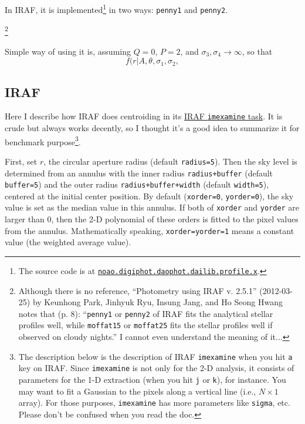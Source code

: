 In IRAF, it is implemented\footnote{The source code is at \href {https://github.com/iraf-community/iraf/blob/master/noao/digiphot/daophot/daolib/profile.x} {\texttt{noao.digiphot.daophot.dailib.profile.x}}.} in two ways: \texttt{penny1} and \texttt{penny2}. 



\footnote{Although there is no reference, ``Photometry using IRAF v. 2.5.1'' (2012-03-25) by Keunhong Park, Jinhyuk Ryu, Insung Jang, and Ho Seong Hwang notes that (p. 8): ``\texttt{penny1} or \texttt{penny2} of IRAF fits the analytical stellar profiles well, while \texttt{moffat15} or \texttt{moffat25} fits the stellar profiles well if observed on cloudy nights.'' I cannot even understand the meaning of it...}

Simple way of using it is, assuming $ Q = 0 $, $ P = 2 $, and $ \sigma_3, \sigma_4 \rightarrow \infty $, so that
\begin{equation}\label{eq: profile penny12}
  f(r|A, \theta, \sigma_1, \sigma_2, 
\end{equation}




\subsection{IRAF}
Here I describe how IRAF does centroiding in its \href{https://iraf.net/irafhelp.php?val=imexam&help=Help+Page}{IRAF \texttt{imexamine} task}. It is crude but always works decently, so I thought it's a good idea to summarize it for benchmark purpose\footnote{The description below is the description of IRAF \texttt{imexamine} when you hit \texttt{a} key on IRAF. Since \texttt{imexamine} is not only for the 2-D analysis, it consists of parameters for the 1-D extraction (when you hit \texttt{j} or \texttt{k}), for instance. You may want to fit a Gaussian to the pixels along a vertical line (i.e., $ N \times 1 $ array). For those purposes, \texttt{imexamine} has more parameters like \texttt{sigma}, etc. Please don't be confused when you read the doc.
}.

First, set $ r $, the circular aperture radius (default \texttt{radius=5}). Then the sky level is determined from an annulus with the inner radius \texttt{radius+buffer} (default \texttt{buffer=5}) and the outer radius \texttt{radius+buffer+width} (default \texttt{width=5}), centered at the initial center position. By default (\texttt{xorder=0}, \texttt{yorder=0}), the sky value is set as the median value in this annulus. If both of \texttt{xorder} and \texttt{yorder} are larger than 0, then the 2-D polynomial of these orders is fitted to the pixel values from the annulus. Mathematically speaking, \texttt{xorder=yorder=1} means a constant value (the weighted average value). 


